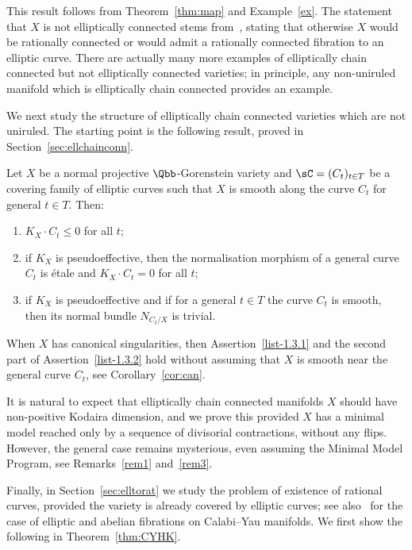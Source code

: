 This result follows from Theorem~\ref{thm:map} and Example~\ref{ex}. The statement that $X$ is not elliptically connected stems from~\cite[Theorem~6.2]{Gou16}, stating that otherwise $X$ would be rationally connected or would admit a rationally connected fibration to an elliptic curve. There are actually many more examples of elliptically chain connected but not elliptically connected varieties; in principle, any non-uniruled manifold which is elliptically chain connected provides an example.

We next study the structure of elliptically chain connected varieties which are not uniruled. The starting point is the following result, proved in Section~\ref{sec:ellchainconn}.

\begin{prop}\label{prop:1.3}
Let $X$ be a normal projective $\Qbb$-Gorenstein variety and $\sC = (C_t)_{t\in T} $ be a covering family of elliptic curves such that $X$ is smooth along the curve $C_t$ for general $t\in T$. Then:
\begin{enumerate}\romanenumi
\item \label{list-1.3.1}$K_X \cdot C_t \leq 0$ for all $t$;
\item \label{list-1.3.2}if $K_X$ is pseudoeffective, then the normalisation morphism of a general curve $C_t$ is étale and $K_X \cdot C_t = 0$ for all $t$;
\item \label{list-1.3.3}if $K_X$ is pseudoeffective and if for a general $t\in T$ the curve $C_t$ is smooth, then its normal bundle $N_{C_t/X}$ is trivial.
\end{enumerate}
\end{prop}

When $X$ has canonical singularities, then Assertion~\eqref{list-1.3.1} and the second part of Assertion~\eqref{list-1.3.2} hold without assuming that $X$ is smooth near the general curve $C_t$, see Corollary~\ref{cor:can}.

It is natural to expect that elliptically chain connected manifolds $X$ should have non-positive Kodaira dimension, and we prove this provided $X$ has a minimal model reached only by a sequence of divisorial contractions, without any flips. However, the general case remains mysterious, even assuming the Minimal Model Program, see Remarks~\ref{rem1} and~\ref{rem3}.


Finally, in Section~\ref{sec:elltorat} we study the problem of existence of rational curves, provided the variety is already covered by elliptic curves; see also~\cite{DFM16} for the case of elliptic and abelian fibrations on Calabi--Yau manifolds. We first show the following in Theorem~\ref{thm:CYHK}.


